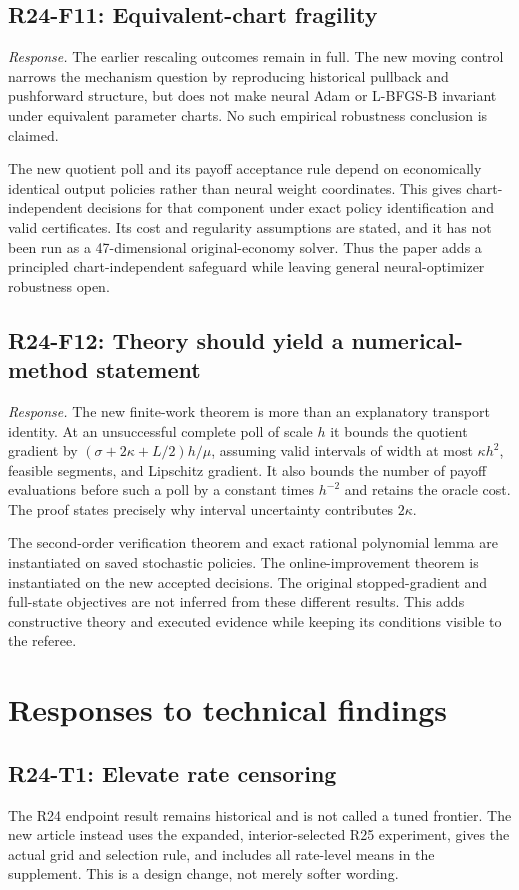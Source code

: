 \subsection{R24-F11: Equivalent-chart fragility}
\emph{Response.} The earlier rescaling outcomes remain in full. The new moving control narrows the mechanism question by reproducing historical pullback and pushforward structure, but does not make neural Adam or L-BFGS-B invariant under equivalent parameter charts. No such empirical robustness conclusion is claimed.

The new quotient poll and its payoff acceptance rule depend on economically identical output policies rather than neural weight coordinates. This gives chart-independent decisions for that component under exact policy identification and valid certificates. Its cost and regularity assumptions are stated, and it has not been run as a 47-dimensional original-economy solver. Thus the paper adds a principled chart-independent safeguard while leaving general neural-optimizer robustness open.

\subsection{R24-F12: Theory should yield a numerical-method statement}
\emph{Response.} The new finite-work theorem is more than an explanatory transport identity. At an unsuccessful complete poll of scale $h$ it bounds the quotient gradient by $(\sigma+2\kappa+L/2)h/\mu$, assuming valid intervals of width at most $\kappa h^2$, feasible segments, and Lipschitz gradient. It also bounds the number of payoff evaluations before such a poll by a constant times $h^{-2}$ and retains the oracle cost. The proof states precisely why interval uncertainty contributes $2\kappa$.

The second-order verification theorem and exact rational polynomial lemma are instantiated on saved stochastic policies. The online-improvement theorem is instantiated on the new accepted decisions. The original stopped-gradient and full-state objectives are not inferred from these different results. This adds constructive theory and executed evidence while keeping its conditions visible to the referee.

\section{Responses to technical findings}
\subsection{R24-T1: Elevate rate censoring}
The R24 endpoint result remains historical and is not called a tuned frontier. The new article instead uses the expanded, interior-selected R25 experiment, gives the actual grid and selection rule, and includes all rate-level means in the supplement. This is a design change, not merely softer wording.

